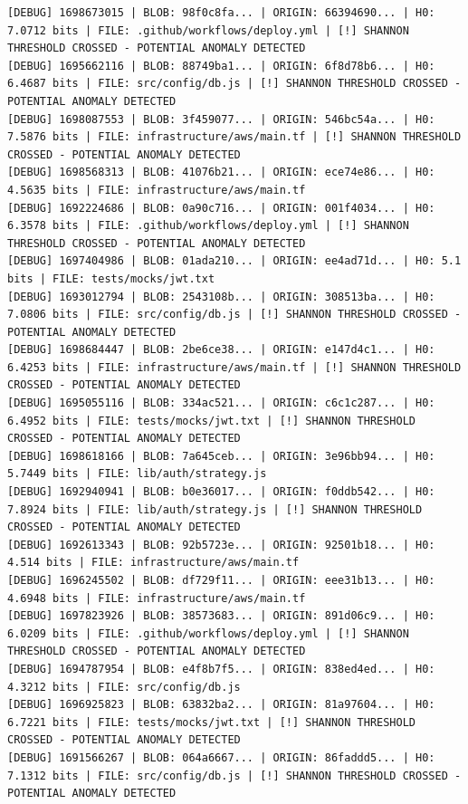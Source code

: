 \documentclass[12pt, a4paper, oneside]{report}
\begin{document}
\begin{lstlisting}[basicstyle=\tiny\ttfamily]
[DEBUG] 1698673015 | BLOB: 98f0c8fa... | ORIGIN: 66394690... | H0: 7.0712 bits | FILE: .github/workflows/deploy.yml | [!] SHANNON THRESHOLD CROSSED - POTENTIAL ANOMALY DETECTED
[DEBUG] 1695662116 | BLOB: 88749ba1... | ORIGIN: 6f8d78b6... | H0: 6.4687 bits | FILE: src/config/db.js | [!] SHANNON THRESHOLD CROSSED - POTENTIAL ANOMALY DETECTED
[DEBUG] 1698087553 | BLOB: 3f459077... | ORIGIN: 546bc54a... | H0: 7.5876 bits | FILE: infrastructure/aws/main.tf | [!] SHANNON THRESHOLD CROSSED - POTENTIAL ANOMALY DETECTED
[DEBUG] 1698568313 | BLOB: 41076b21... | ORIGIN: ece74e86... | H0: 4.5635 bits | FILE: infrastructure/aws/main.tf
[DEBUG] 1692224686 | BLOB: 0a90c716... | ORIGIN: 001f4034... | H0: 6.3578 bits | FILE: .github/workflows/deploy.yml | [!] SHANNON THRESHOLD CROSSED - POTENTIAL ANOMALY DETECTED
[DEBUG] 1697404986 | BLOB: 01ada210... | ORIGIN: ee4ad71d... | H0: 5.1 bits | FILE: tests/mocks/jwt.txt
[DEBUG] 1693012794 | BLOB: 2543108b... | ORIGIN: 308513ba... | H0: 7.0806 bits | FILE: src/config/db.js | [!] SHANNON THRESHOLD CROSSED - POTENTIAL ANOMALY DETECTED
[DEBUG] 1698684447 | BLOB: 2be6ce38... | ORIGIN: e147d4c1... | H0: 6.4253 bits | FILE: infrastructure/aws/main.tf | [!] SHANNON THRESHOLD CROSSED - POTENTIAL ANOMALY DETECTED
[DEBUG] 1695055116 | BLOB: 334ac521... | ORIGIN: c6c1c287... | H0: 6.4952 bits | FILE: tests/mocks/jwt.txt | [!] SHANNON THRESHOLD CROSSED - POTENTIAL ANOMALY DETECTED
[DEBUG] 1698618166 | BLOB: 7a645ceb... | ORIGIN: 3e96bb94... | H0: 5.7449 bits | FILE: lib/auth/strategy.js
[DEBUG] 1692940941 | BLOB: b0e36017... | ORIGIN: f0ddb542... | H0: 7.8924 bits | FILE: lib/auth/strategy.js | [!] SHANNON THRESHOLD CROSSED - POTENTIAL ANOMALY DETECTED
[DEBUG] 1692613343 | BLOB: 92b5723e... | ORIGIN: 92501b18... | H0: 4.514 bits | FILE: infrastructure/aws/main.tf
[DEBUG] 1696245502 | BLOB: df729f11... | ORIGIN: eee31b13... | H0: 4.6948 bits | FILE: infrastructure/aws/main.tf
[DEBUG] 1697823926 | BLOB: 38573683... | ORIGIN: 891d06c9... | H0: 6.0209 bits | FILE: .github/workflows/deploy.yml | [!] SHANNON THRESHOLD CROSSED - POTENTIAL ANOMALY DETECTED
[DEBUG] 1694787954 | BLOB: e4f8b7f5... | ORIGIN: 838ed4ed... | H0: 4.3212 bits | FILE: src/config/db.js
[DEBUG] 1696925823 | BLOB: 63832ba2... | ORIGIN: 81a97604... | H0: 6.7221 bits | FILE: tests/mocks/jwt.txt | [!] SHANNON THRESHOLD CROSSED - POTENTIAL ANOMALY DETECTED
[DEBUG] 1691566267 | BLOB: 064a6667... | ORIGIN: 86faddd5... | H0: 7.1312 bits | FILE: src/config/db.js | [!] SHANNON THRESHOLD CROSSED - POTENTIAL ANOMALY DETECTED

\end{lstlisting}
\end{document}
